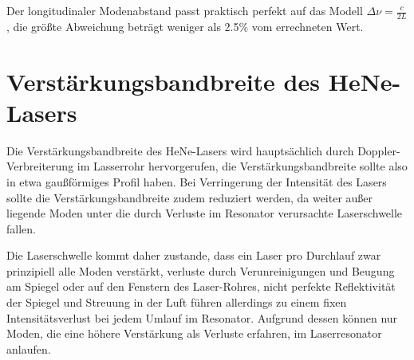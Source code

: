 \documentclass[bigchapter,colorback,accentcolor=tud4b,linedtoc,11pt]{tudreport}
\numberwithin{equation}{subsection}
\begin{document}
\FloatBarrier
Der longitudinaler Modenabstand passt praktisch perfekt auf das Modell $\Delta\nu = \frac{c}{2L}$, die größte Abweichung beträgt weniger als 2.5\% vom errechneten Wert.
\section{Verstärkungsbandbreite des HeNe-Lasers}
Die Verstärkungsbandbreite des HeNe-Lasers wird hauptsächlich durch Doppler-Verbreiterung im Lasserrohr hervorgerufen, die Verstärkungsbandbreite sollte also in etwa gaußförmiges Profil haben. Bei Verringerung der Intensität des Lasers sollte die Verstärkungsbandbreite zudem reduziert werden, da weiter außer liegende Moden unter die durch Verluste im Resonator verursachte Laserschwelle fallen.

Die Laserschwelle kommt daher zustande, dass ein Laser pro Durchlauf zwar prinzipiell alle Moden verstärkt, verluste durch Verunreinigungen und Beugung am Spiegel oder auf den Fenstern des Laser-Rohres, nicht perfekte Reflektivität der Spiegel und Streuung in der Luft führen allerdings zu einem fixen Intensitätsverlust bei jedem Umlauf im Resonator. Aufgrund dessen können nur Moden, die eine höhere Verstärkung als Verluste erfahren, im Laserresonator anlaufen.
\end{document}
